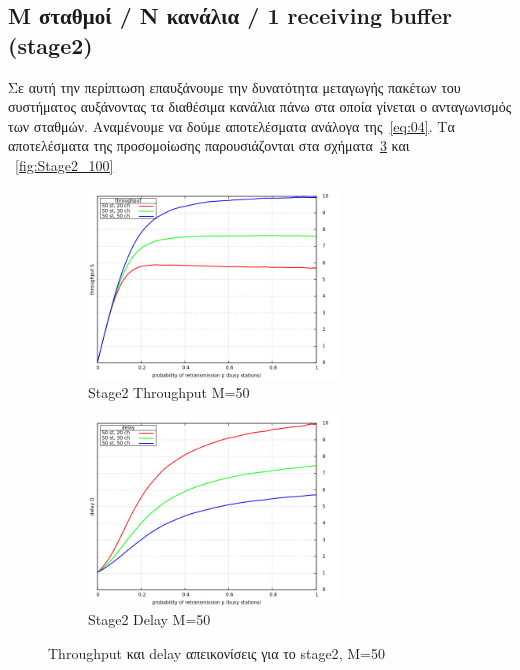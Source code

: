 \documentclass[12pt]{report}
\begin{document}
\subsection{\textlatin{M} σταθμοί / \textlatin{N} κανάλια / 1 \textlatin{receiving buffer} (\textlatin{stage2})}
Σε αυτή την περίπτωση επαυξάνουμε την δυνατότητα μεταγωγής πακέτων του συστήματος αυξάνοντας τα διαθέσιμα κανάλια πάνω στα οποία γίνεται ο ανταγωνισμός των σταθμών. Αναμένουμε να δούμε αποτελέσματα ανάλογα της~\ref{eq:04}. Τα αποτελέσματα της προσομοίωσης παρουσιάζονται στα σχήματα~\ref{fig:Stage2_50} και ~\ref{fig:Stage2_100}
\begin{figure}[h]
\begin{subfigure}{0.5\textwidth}
\includegraphics[width=0.9\linewidth, height=5cm]{st2_throughput_M50} 
\caption{\textlatin{Stage2 Throughput M=50}}
\label{fig:st2_throughput_50}
\end{subfigure}
\begin{subfigure}{0.5\textwidth}
\includegraphics[width=0.9\linewidth, height=5cm]{st2_delay_M50}
\caption{\textlatin{Stage2 Delay M=50}}
\label{fig:st2_delay_50}
\end{subfigure}
 
\caption{\textlatin{Throughput} και \textlatin{delay} απεικονίσεις για το \textlatin{stage2}, M=50}
\label{fig:Stage2_50}
\end{figure}
\end{document}
